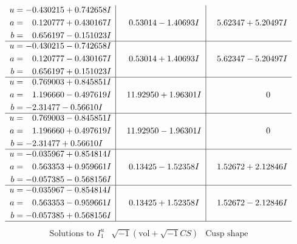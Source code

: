 \documentclass[1p]{elsarticle_modified}
\theoremstyle{definition}
\newcommand{\I}{\sqrt{-1}}
\begin{document}
$$\begin{array}{c|c|c}
\begin{aligned}
u &= -0.430215 + 0.742658 I \\
a &= \phantom{-}0.120777 + 0.430167 I \\
b &= \phantom{-}0.656197 - 0.151023 I\end{aligned}
 & \phantom{-}0.53014 - 1.40693 I & \phantom{-}5.62347 + 5.20497 I \\ \hline\begin{aligned}
u &= -0.430215 - 0.742658 I \\
a &= \phantom{-}0.120777 - 0.430167 I \\
b &= \phantom{-}0.656197 + 0.151023 I\end{aligned}
 & \phantom{-}0.53014 + 1.40693 I & \phantom{-}5.62347 - 5.20497 I \\ \hline\begin{aligned}
u &= \phantom{-}0.769003 + 0.845851 I \\
a &= \phantom{-}1.196660 - 0.497619 I \\
b &= -2.31477 - 0.56610 I\end{aligned}
 & \phantom{-}11.92950 + 1.96301 I & \phantom{-0.000000 } 0 \\ \hline\begin{aligned}
u &= \phantom{-}0.769003 - 0.845851 I \\
a &= \phantom{-}1.196660 + 0.497619 I \\
b &= -2.31477 + 0.56610 I\end{aligned}
 & \phantom{-}11.92950 - 1.96301 I & \phantom{-0.000000 } 0 \\ \hline\begin{aligned}
u &= -0.035967 + 0.854814 I \\
a &= \phantom{-}0.563353 + 0.959661 I \\
b &= -0.057385 - 0.568156 I\end{aligned}
 & \phantom{-}0.13425 - 1.52358 I & \phantom{-}1.52672 + 2.12846 I \\ \hline\begin{aligned}
u &= -0.035967 - 0.854814 I \\
a &= \phantom{-}0.563353 - 0.959661 I \\
b &= -0.057385 + 0.568156 I\end{aligned}
 & \phantom{-}0.13425 + 1.52358 I & \phantom{-}1.52672 - 2.12846 I\\
 \hline 
 \end{array}$$\newpage$$\begin{array}{c|c|c}  
\text{Solutions to }I^u_{1}& \I (\text{vol} + \sqrt{-1}CS) & \text{Cusp shape}\\

\end{array}$$
\end{document}

